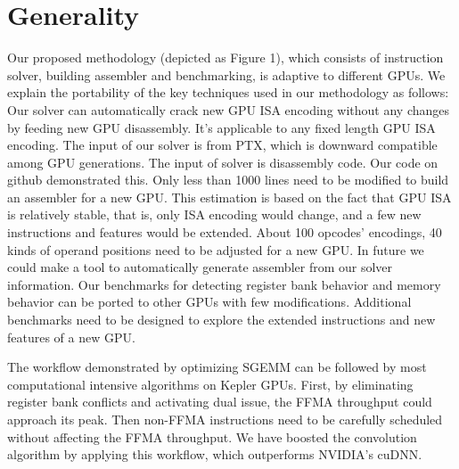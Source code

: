 \section{Generality}
\label{sec:generality}
Our proposed methodology (depicted as Figure 1), which consists of instruction solver, building assembler and benchmarking, is adaptive to different GPUs. We explain the portability of the key techniques used in our methodology as follows:
Our solver can automatically crack new GPU ISA encoding without any changes by feeding new GPU disassembly. It's applicable to any fixed length GPU ISA encoding. The input of our solver is from PTX, which is downward compatible among GPU generations. The input of solver is disassembly code. Our code on github demonstrated this.
Only less than 1000 lines need to be modified to build an assembler for a new GPU. This estimation is based on the fact that GPU ISA is relatively stable, that is, only ISA encoding would change, and a few new instructions and features would be extended. About 100 opcodes' encodings, 40 kinds of operand positions need to be adjusted for a new GPU. In future we could make a tool to automatically generate  assembler from our solver information.
Our benchmarks for detecting register bank behavior and memory behavior can be ported to other GPUs with few modifications. Additional benchmarks need to be designed to explore the extended instructions and new features of a new GPU.

The workflow demonstrated by optimizing SGEMM can be followed by most computational intensive algorithms on Kepler GPUs. First, by eliminating register bank conflicts and activating dual issue, the FFMA throughput could approach its peak. Then non-FFMA instructions need to be carefully scheduled without affecting the FFMA throughput. We have boosted the convolution algorithm by applying this workflow, which outperforms NVIDIA's cuDNN.
